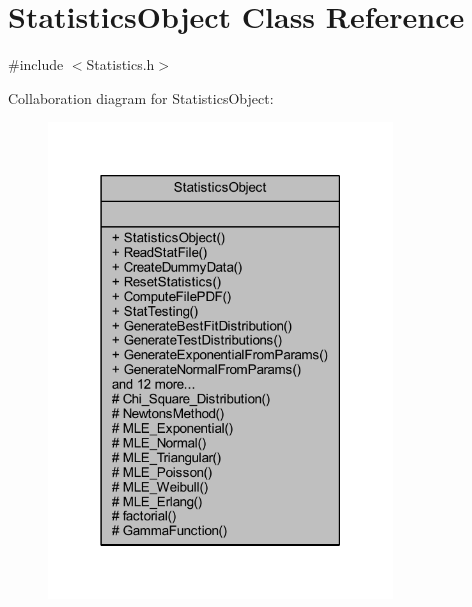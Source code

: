 \hypertarget{class_statistics_object}{}\section{Statistics\+Object Class Reference}
\label{class_statistics_object}


{\ttfamily \#include $<$Statistics.\+h$>$}



Collaboration diagram for Statistics\+Object\+:\nopagebreak
\begin{figure}[H]
\begin{center}
\leavevmode
\includegraphics[width=259pt]{class_statistics_object__coll__graph}
\end{center}
\end{figure}
